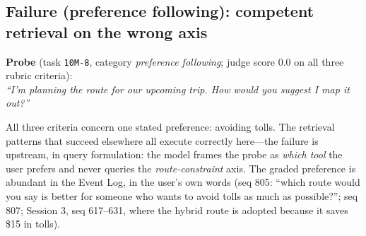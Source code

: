 \subsection{Failure (preference following): competent retrieval on the wrong axis}
\label{app:traj-pf}

\begin{tcolorbox}[colback=codebg, colframe=codeframe, boxrule=0.6pt, left=6pt, right=6pt, top=5pt, bottom=5pt]
\textbf{Probe} (task \texttt{10M-8}, category \emph{preference following}; judge score 0.0 on all three rubric criteria):\\[3pt]
\emph{``I'm planning the route for our upcoming trip. How would you suggest
I map it out?''}
\end{tcolorbox}

All three
criteria concern one stated preference: avoiding tolls. The retrieval
patterns that succeed elsewhere all execute correctly here---the failure is
upstream, in query formulation: the model frames the probe as \emph{which
tool} the user prefers and never queries the \emph{route-constraint} axis.
The graded preference is abundant in the Event Log, in the user's own words
(seq 805: ``which route would you say is better for someone who wants to
avoid tolls as much as possible?''; seq 807; Session 3, seq 617--631, where
the hybrid route is adopted because it saves \$15 in tolls).

